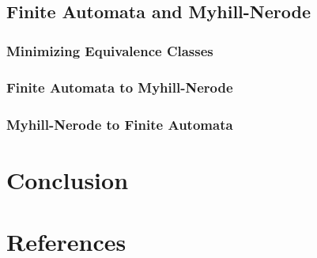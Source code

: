 \documentclass[11pt,a4paper,oneside]{book}
\begin{document}
                \paragraph{}





        \section{Finite Automata and Myhill-Nerode}

            \paragraph{}

            \subsection{Minimizing Equivalence Classes}

                \paragraph{}
            
            \subsection{Finite Automata to Myhill-Nerode}

                \paragraph{}

            \subsection{Myhill-Nerode to Finite Automata}

                \paragraph{}


    \chapter{Conclusion}

    \chapter{References}

    {}
    
\end{document}
